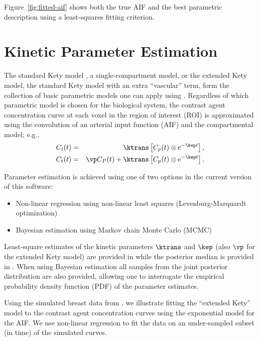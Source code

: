 Figure~\ref{fig:fitted-aif} shows both the true AIF and the best
parametric description using a least-squares fitting criterion.

\section{Kinetic Parameter Estimation}

The standard Kety model \citep{ket:blood-tissue}, a single-compartment
model, or the extended Kety model, the standard Kety model with an
extra ``vascular'' term, form the collection of basic parametric
models one can apply using .  Regardless of which
parametric model is chosen for the biological system, the contrast
agent concentration curve at each voxel in the region of interest
(ROI) is approximated using the convolution of an arterial input
function (AIF) and the compartmental model; e.g.,
\begin{eqnarray*}
  C_t(t) & = & \ktrans \left[ C_p(t) \otimes e^{-\kep t} \right],\\
  C_t(t) & = & \vp C_P(t) + \ktrans \left[ C_p(t) \otimes e^{-\kep t}
    \right].
\end{eqnarray*}

Parameter estimation is achieved using one of two options in the
current version of this software:
\begin{itemize}
\item Non-linear regression using non-linear least squares
  (Levenburg-Marquardt optimization)
\item Bayesian estimation using Markov chain Monte Carlo (MCMC)
  \citep{sch-etal:TMI}
\end{itemize}
Least-square estimates of the kinetic parameters $\ktrans$ and $\kep$
(also $\vp$ for the extended Kety model) are provided in
 while the posterior median is provided in
.  When using Bayesian estimation all samples from
the joint posterior distribution are also provided, allowing one to
interrogate the empirical probability density function (PDF) of the
parameter estimates.

Using the simulated breast data from \cite{buc:uncertainty}, we
illustrate fitting the ``extended Kety'' model to the contrast agent
concentration curves using the exponential model for the AIF.  We use
non-linear regression to fit the data on an under-sampled subset (in
time) of
the simulated curves.

